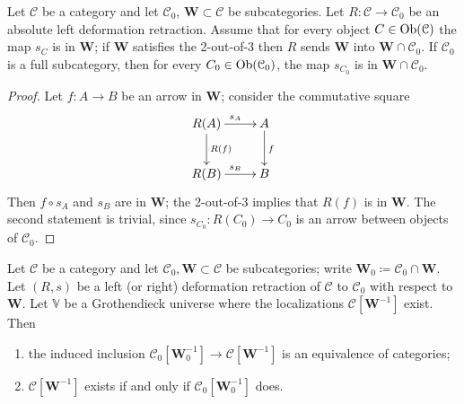 \begin{refsection}
\begin{lemma} \label{lemma localizing subcategories}
Let $\mathcal C$ be a category and let $\mathcal C_0$, $\mathbf W \subset \mathcal C$ be subcategories. Let $R \colon \mathcal C \to \mathcal C_0$ be an absolute left deformation retraction. Assume that for every object $C \in \operatorname{Ob}(\mathcal C)$ the map $s_C$ is in $\mathbf W$; if $\mathbf W$ satisfies the 2-out-of-3 then $R$ sends $\mathbf W$ into $\mathbf W \cap \mathcal C_0$. If $\mathcal C_0$ is a full subcategory, then for every $C_0 \in \operatorname{Ob}(\mathcal C_0)$, the map $s_{C_0}$ is in $\mathbf W \cap \mathcal C_0$.
\end{lemma}

\begin{proof}
Let $f \colon A \to B$ be an arrow in $\mathbf W$; consider the commutative square
\[
\xymatrix{
R(A) \ar[d]^{R(f)} \ar[r]^{s_A} & A \ar[d]^f \\ R(B) \ar[r]^{s_B} & B
}
\]
Then $f \circ s_A$ and $s_B$ are in $\mathbf W$; the 2-out-of-3 implies that $R(f)$ is in $\mathbf W$. The second statement is trivial, since $s_{C_0} \colon R(C_0) \to C_0$ is an arrow between objects of $\mathcal C_0$.
\end{proof}

\begin{prop} \label{prop localizing subcategories}
Let $\mathcal C$ be a category and let $\mathcal C_0, \mathbf W \subset \mathcal C$ be subcategories; write $\mathbf W_0\coloneqq \mathcal C_0 \cap \mathbf W$. Let $(R,s)$ be a left (or right) deformation retraction of $\mathcal C$ to $\mathcal C_0$ with respect to $\mathbf W$. Let $\mathbb V$ be a Grothendieck universe where the localizations $\mathcal C[\mathbf W^{-1}]$ exist. Then
\begin{enumerate}
\item the induced inclusion $\mathcal C_0[\mathbf W_0^{-1}] \to \mathcal C[\mathbf W^{-1}]$ is an equivalence of categories;
\item $\mathcal C[\mathbf W^{-1}]$ exists if and only if $\mathcal C_0[\mathbf W_0^{-1}]$ does.
\end{enumerate}
\end{prop}


\end{refsection}
